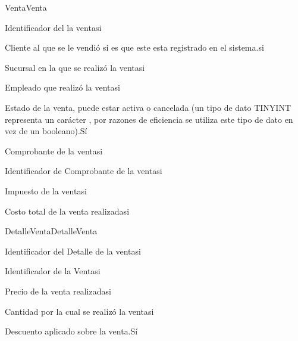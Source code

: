 \begin{cdtEntidad}{Venta}{Venta}

		{Identificador del la venta}{si}
		
		{Cliente al que se le vendió si es que este esta registrado en el sistema.}{si}
		
		{Sucursal en la que se realizó la venta}{si}
		
		{Empleado que realizó la venta}{si}
		
		{Estado de la venta, puede estar activa o cancelada (un tipo de dato TINYINT representa un carácter , por razones de eficiencia se utiliza este tipo de dato en vez de un booleano).}{Sí}	

		{Comprobante de la venta}{si}
		
		{Identificador de Comprobante de la venta}{si}
		
		{Impuesto de la venta}{si}
		
		{Costo total de la venta realizada}{si}
	
\end{cdtEntidad}

\begin{cdtEntidad}{DetalleVenta}{DetalleVenta}

		{Identificador del Detalle de la venta}{si}
		
		{Identificador de la Venta}{si}
		
		{Precio de la venta realizada}{si}
		
		{Cantidad por la cual se realizó la venta}{si}
		
		{Descuento aplicado sobre la venta.}{Sí}	
	
\end{cdtEntidad}

